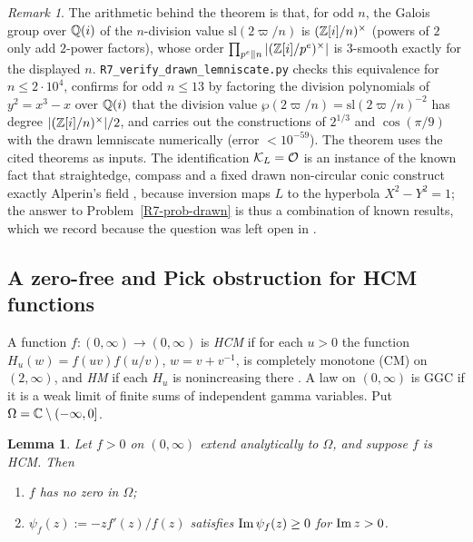 \documentclass[11pt]{amsart}
\newtheorem{lemma}[theorem]{Lemma}
\theoremstyle{definition}
\theoremstyle{remark}
\newtheorem{remark}[theorem]{Remark}
\begin{document}
\begin{remark}
The arithmetic behind the theorem is that, for odd $n$, the Galois group
over $\mathbb{Q}(i)$ of the $n$-division value $\mathrm{sl}(2\varpi/n)$ is
$(\mathbb{Z}[i]/n)^\times$ \cite[Corollary~4.8]{R7-CoxHyde14} (powers of $2$ only
add $2$-power factors), whose order
$\prod_{p^e\| n}|(\mathbb{Z}[i]/p^e)^\times|$ is $3$-smooth exactly for the
displayed $n$. \texttt{R7\_\allowbreak{}verify\_\allowbreak{}drawn\_\allowbreak{}lemniscate.py} checks this
equivalence for $n\le 2\cdot10^4$, confirms for odd $n\le13$ by factoring the
division polynomials of $y^2=x^3-x$ over $\mathbb{Q}(i)$ that the division value
$\wp(2\varpi/n)=\mathrm{sl}(2\varpi/n)^{-2}$ has degree
$|(\mathbb{Z}[i]/n)^\times|/2$, and carries out the constructions of $2^{1/3}$ and
$\cos(\pi/9)$ with the drawn lemniscate numerically (error $<10^{-59}$).
The theorem uses the cited theorems as inputs. The identification
$\mathcal{K}_L=\mathcal{O}$ is an instance of the known fact that straightedge, compass
and a fixed drawn non-circular conic construct exactly Alperin's field
\cite{R7-Videla,R7-BCJLS}, because inversion maps $L$ to the hyperbola
$X^2-Y^2=1$; the answer to Problem~\ref{R7-prob-drawn} is thus a combination of
known results, which we record because the question was left open in
\cite{R7-MRS16}.
\end{remark}

\subsection{A zero-free and Pick obstruction for HCM functions}
\label{R7-ssec-pick}

A function $f:(0,\infty)\to(0,\infty)$ is \emph{HCM} if for each $u>0$ the
function $H_u(w)=f(uv)f(u/v)$, $w=v+v^{-1}$, is completely monotone (CM) on
$(2,\infty)$, and \emph{HM} if each $H_u$ is nonincreasing there
\cite{R7-JS13,R7-Bondesson92}. A law on $(0,\infty)$ is GGC if it is a weak
limit of finite sums of independent gamma variables. Put
$\Omega=\mathbb{C}\setminus(-\infty,0]$.

\begin{lemma}\label{R7-lem-pick}
Let $f>0$ on $(0,\infty)$ extend analytically to $\Omega$, and suppose $f$ is
HCM. Then
\begin{enumerate}
\item[(1)] $f$ has no zero in $\Omega$;
\item[(2)] $\psi_f(z):=-zf'(z)/f(z)$ satisfies $\operatorname{Im}\psi_f(z)\ge0$ for
  $\operatorname{Im} z>0$.
\end{enumerate}
\end{lemma}
\end{document}
